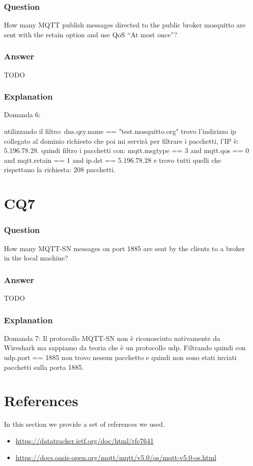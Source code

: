 \subsubsection{Question}
How many MQTT publish messages directed to the public broker mosquitto are sent with the retain option and use QoS “At most once”?

\subsubsection{Answer}
TODO 

\subsubsection{Explanation}

Domanda 6:

utilizzando il filtro: dns.qry.name == "test.mosquitto.org" trovo l'indirizzo ip collegato al dominio richiesto che poi mi servirà per filtrare i pacchetti, l'IP è:  5.196.78.28.
quindi filtro i pacchetti con: mqtt.msgtype == 3 and mqtt.qos == 0 and mqtt.retain == 1 and ip.dst == 5.196.78.28 e trovo tutti quelli che rispettano la richiesta: 208 pacchetti.

\section{CQ7}
\subsubsection{Question}
How many MQTT-SN messages on port 1885 are sent by the clients to a broker in the local machine?

\subsubsection{Answer}
TODO 

\subsubsection{Explanation}

Domanda 7: 
Il protocollo MQTT-SN non è riconosciuto nativamente da Wireshark ma sappiamo da teoria che è un protocollo udp. Filtrando quindi con udp.port == 1885 non trovo nessun pacchetto e quindi non sono stati inviati pacchetti sulla porta 1885.

\section{References}
In this section we provide a set of references we used.
\begin{itemize}
	\item \url{https://datatracker.ietf.org/doc/html/rfc7641}
	\item \url{https://docs.oasis-open.org/mqtt/mqtt/v5.0/os/mqtt-v5.0-os.html}
\end{itemize}
























